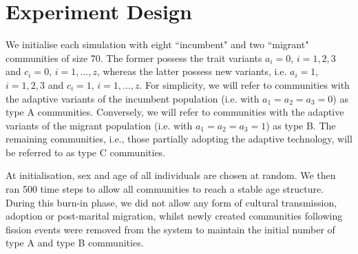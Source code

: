 \documentclass[9pt,twocolumn,twoside,lineno]{pnas-new}
\begin{document}
\section*{Experiment Design}

We initialise each simulation with eight ``incumbent" and two ``migrant" communities of size 70.
The former possess the trait variants $a_i=0$, $i=1,2,3$ and $c_i=0$, $i=1,\ldots,z$, whereas the latter possess new variants, i.e. $a_i=1$, $i=1,2,3$ and $c_i=1$, $i=1,\ldots,z$.
For simplicity, we will refer to communities with the adaptive variants of the incumbent population (i.e. with $a_1=a_2=a_3=0$) as type A communities.
Conversely, we will refer to communities with the adaptive variants of the migrant population (i.e. with $a_1=a_2=a_3=1$) as type B.
The remaining communities, i.e., those partially adopting the adaptive technology, will be referred to as type C communities. 

At initialisation, sex and age of all individuals are chosen at random. 
We then ran 500 time steps to allow all communities to reach a stable age structure.
During this burn-in phase, we did not allow any form of cultural transmission, adoption or post-marital migration, whilst newly created communities following fission events were removed from the system to maintain the initial number of type A and type B communities.

\end{document}
